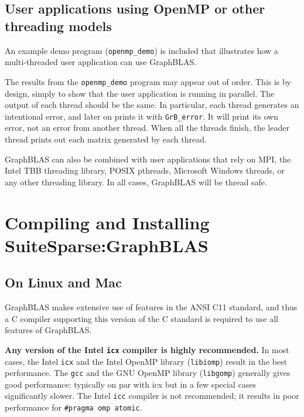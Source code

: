 \documentclass[12pt]{article}
\begin{document}
{%
\subsection{User applications using OpenMP or other threading models}
\label{threads}

An example demo program (\verb'openmp_demo') is included that illustrates how a
multi-threaded user application can use GraphBLAS.

The results from the \verb'openmp_demo' program may appear out of order.  This
is by design, simply to show that the user application is running in parallel.
The output of each thread should be the same.  In particular, each thread
generates an intentional error, and later on prints it with \verb'GrB_error'.
It will print its own error, not an error from another thread.  When all the
threads finish, the leader thread prints out each matrix generated by each
thread.

GraphBLAS can also be combined with user applications that rely on MPI, the
Intel TBB threading library, POSIX pthreads, Microsoft Windows threads, or any
other threading library.  In all cases, GraphBLAS will be thread safe.

\newpage
\section{Compiling and Installing SuiteSparse:GraphBLAS}
\label{sec:install}

\subsection{On Linux and Mac}

GraphBLAS makes extensive use of features in the ANSI C11 standard, and thus a
C compiler supporting this version of the C standard is required to use
all features of GraphBLAS. 

{\bf Any version of the Intel \verb'icx' compiler is highly recommended.} In
most cases, the Intel \verb'icx' and the Intel OpenMP library (\verb'libiomp')
result in the best performance.  The \verb'gcc' and the GNU OpenMP library
(\verb'libgomp') generally gives good performance: typically on par with icx
but in a few special cases significantly slower.  The Intel \verb'icc' compiler
is not recommended; it results in poor performance for
\verb'#pragma omp atomic'.

}
\end{document}

